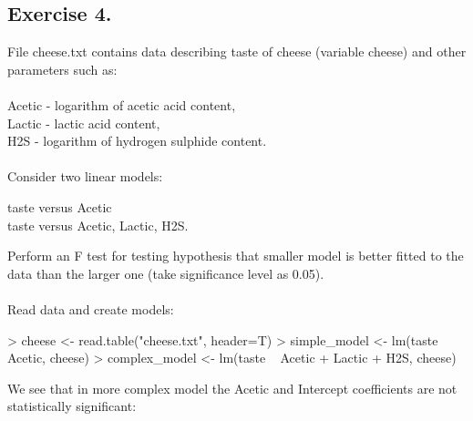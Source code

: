 \documentclass[a4paper]{article}
\begin{document}
\subsection{Exercise 4.} File cheese.txt contains data describing taste of cheese (variable cheese) and other parameters such as:\\
\\
Acetic - logarithm of acetic acid content, \\
Lactic - lactic acid content, \\
H2S - logarithm of hydrogen sulphide content. \\
\\
Consider two linear models:
\begin{center}
taste versus Acetic \\
taste versus Acetic, Lactic, H2S.
\end{center}
Perform an F test for testing hypothesis that smaller model is better fitted to the data than the larger one (take significance level as 0.05).\\\\
Read data and create models:
\begin{Schunk}
\begin{Sinput}
> cheese <- read.table("cheese.txt", header=T)
> simple_model <- lm(taste ~ Acetic, cheese)
> complex_model <- lm(taste ~ Acetic + Lactic + H2S, cheese)
\end{Sinput}
\end{Schunk}
We see that in more complex model the Acetic and Intercept coefficients are not statistically significant:
\end{document}
